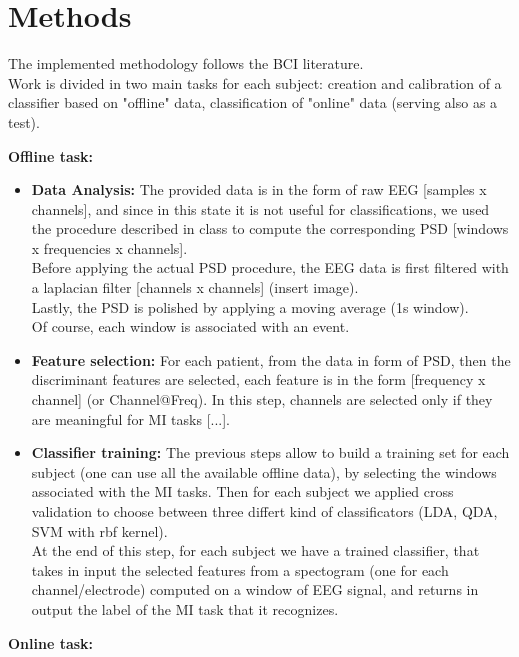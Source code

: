 \section{Methods}
The implemented methodology follows the BCI literature. \\
Work is divided in two main tasks for each subject: creation and calibration of a classifier based on "offline" data, classification of "online" data (serving also as a test). \\
\newpage

{\Large \textbf{Offline task:}}

\begin{itemize}
\item \textbf{Data Analysis:} The provided data is in the form of raw EEG [samples x channels], and since in this state it is not useful for classifications, we used the  procedure described in class to compute the corresponding PSD [windows x frequencies x channels].\\
Before applying the actual PSD procedure, the EEG data is first filtered with a laplacian filter [channels x channels] (insert image).\\
Lastly, the PSD is polished by applying a moving average (1s window). \\
Of course, each window is associated with an event.
\item \textbf{Feature selection:}  For each patient, from the data in form of PSD, then the discriminant features are selected, each feature is in the form [frequency x channel] (or Channel@Freq). In this step, channels are selected only if they are meaningful for MI tasks [...]. \\
\item \textbf{Classifier training:} The previous steps allow to build a training set for each subject (one can use all the available offline data), by selecting the windows associated with the MI tasks. Then for each subject we applied cross validation to choose between three differt kind of classificators (LDA, QDA, SVM with rbf kernel).\\
At the end of this step, for each subject we have a trained classifier, that takes in input the selected features from a spectogram (one for each channel/electrode) computed on a window of EEG signal, and returns in output the label of the MI task that it recognizes. \\
\end{itemize}

\noindent
{\Large\textbf{Online task:}}

